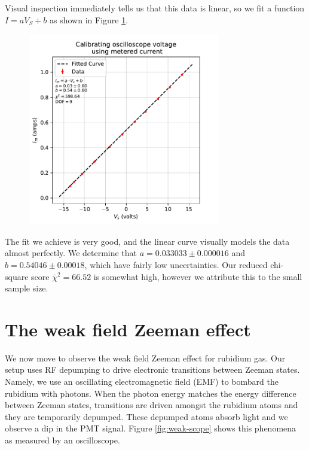 \documentclass[12pt, letterpaper]{article}
\begin{document}
Visual inspection immediately tells us that this data is linear, so we fit a function $I = a V_S + b$ as shown in Figure \ref{fig:calibration}. 
\begin{figure}[!h]
    \centering
    \includegraphics[width=0.75\textwidth]{experiment4/figures/calibration.pdf}
    \caption{}
    \label{fig:calibration}
\end{figure}
The fit we achieve is very good, and the linear curve visually models the data almost perfectly. We determine that $a = 0.033033 \pm 0.000016$ and $b = 0.54046 \pm 0.00018$, which have fairly low uncertainties. Our reduced chi-square score $\bar{\chi}^2 = 66.52$ is somewhat high, however we attribute this to the small sample size. 

\section{The weak field Zeeman effect} \label{sec:weak}

We now move to observe the weak field Zeeman effect for rubidium gas. Our setup uses RF depumping to drive electronic transitions between Zeeman states. Namely, we use an oscillating electromagnetic field (EMF) to bombard the rubidium with photons. When the photon energy matches the energy difference between Zeeman states, transitions are driven amongst the rubidium atoms and they are temporarily depumped. These depumped atoms absorb light and we observe a dip in the PMT signal. Figure \ref{fig:weak-scope} shows this phenomena as measured by an oscilloscope. 
\end{document}
